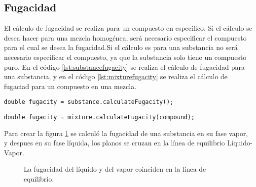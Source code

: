 \subsection{Fugacidad}\label{subsec:fugacity}
	
	El cálculo de fugacidad se realiza para un compuesto en específico. Si el cálculo se desea hacer para una mezcla homogénea, será necesario especificar el compuesto para el cual se desea la fugacidad.Si el cálculo es para una substancia no será necesario especificar el compuesto, ya que la substancia solo tiene un compuesto puro. En el código \ref{lst:substancefugacity} se realiza el cálculo de fugacidad para una substancia, y en el código \ref{lst:mixturefugacity} se realiza el cálculo de fugaciad para un compuesto en una mezcla.

\begin{lstlisting}[label={lst:substancefugacity}, caption={Cálculo de la fugacidad para una substancia homogénea.}]
	double fugacity = substance.calculateFugacity();
\end{lstlisting}

\begin{lstlisting}[label={lst:mixturefugacity}, caption={Cálculo de la fugacidad para un compuesto en una mezcla.}]
	double fugacity = mixture.calculateFugacity(compound);
\end{lstlisting}

	Para crear la figura \ref{fig:fugacity} se calculó la fugacidad de una substancia en su fase vapor, y despues en su fase líquida, los planos se cruzan en la línea de equilibrio Líquido-Vapor.

\begin{figure}
	\centering
	\caption{La fugacidad del líquido y del vapor coinciden en la línea de equilibrio.}\label{fig:fugacity}
\end{figure}



